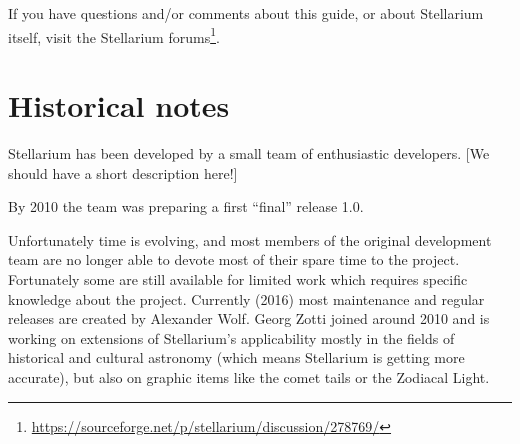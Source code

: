 If you have questions and/or comments about this guide, 
or about Stellarium itself, visit the Stellarium forums\footnote{%
\url{https://sourceforge.net/p/stellarium/discussion/278769/}}.


\section{Historical notes}
\label{sec:Introduction:HistoricalNotes}



Stellarium has been developed by a small team of enthusiastic developers. 
[We should have a short description here!]



By 2010 the team was preparing a first ``final'' release 1.0. 

Unfortunately time is evolving, and most members of the original
development team are no longer able to devote most of their spare time
to the project. Fortunately some are still available for limited work
which requires specific knowledge about the project. Currently (2016)
most maintenance and regular releases are created by Alexander
Wolf. Georg Zotti joined around 2010 and is working on extensions of Stellarium's applicability
mostly in the fields of historical and cultural astronomy (which means Stellarium is getting more accurate), but also on
graphic items like the comet tails or the Zodiacal Light.

